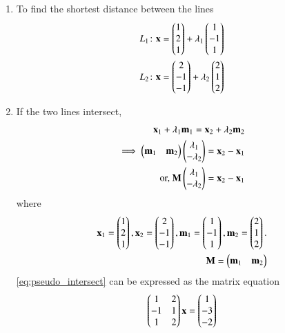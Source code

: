 \renewcommand{\theequation}{\theenumi}
\begin{enumerate}[label=\thesection.\arabic*.,ref=\thesection.\theenumi]

\item To find the shortest distance between the lines 
\begin{align}
    L_1\colon \mathbf{x}=\begin{pmatrix}1\\2\\1\end{pmatrix}+\lambda_1\begin{pmatrix}1\\-1\\1\end{pmatrix}\label{eq:pseudo:1}\\
    L_2\colon \mathbf{x}=\begin{pmatrix}2\\-1\\-1\end{pmatrix}+\lambda_2\begin{pmatrix}2\\1\\2\end{pmatrix}\label{eq:pseudo:2}
\end{align}
\item If the two lines intersect,
\begin{align}
\mathbf{x}_1 + \lambda_1 \mathbf{m}_1
=\mathbf{x}_2 + \lambda_2 \mathbf{m}_2
\\
\implies \begin{pmatrix}\mathbf{m}_1 & \mathbf{m}_2\end{pmatrix}\begin{pmatrix}\lambda_1 \\ -\lambda_2\end{pmatrix} = \mathbf{x}_2 - \mathbf{x}_1
\\
\text{or, } \mathbf{M}\begin{pmatrix}\lambda_1 \\ -\lambda_2\end{pmatrix} = \mathbf{x}_2 - \mathbf{x}_1
\label{eq:pseudo_intersect}
\end{align}
%
where 
\begin{align}
\label{eq:pseudo_xm}
\mathbf{x}_1 = \begin{pmatrix}1\\2\\1\end{pmatrix},
\mathbf{x}_2 = \begin{pmatrix}2\\-1\\-1\end{pmatrix},
\mathbf{m}_1 = \begin{pmatrix}1\\-1\\1\end{pmatrix},
\mathbf{m}_2 = \begin{pmatrix}2\\1\\2\end{pmatrix}.
\\
\mathbf{M} =\begin{pmatrix}\mathbf{m}_1 & \mathbf{m}_2\end{pmatrix}
\label{eq:pseudo_rect}
\end{align}
\eqref{eq:pseudo_intersect} can be expressed as the matrix equation 
\begin{align}
\begin{pmatrix}
1 & 2
\\
-1 & 1
\\
1 & 2
\end{pmatrix}
\mathbf{x} =
\begin{pmatrix}1 \\ -3 \\ -2\end{pmatrix}
\label{eq:pseudo_mat_eq}
\end{align}


\end{enumerate}
